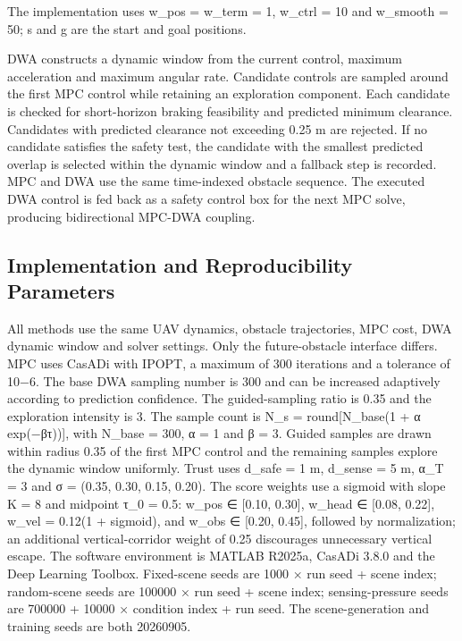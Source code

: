 \documentclass[10pt,a4paper]{article}
\begin{document}
The implementation uses w\_pos = w\_term = 1, w\_ctrl = 10 and w\_smooth = 50; s and g are the start and goal positions.

DWA constructs a dynamic window from the current control, maximum acceleration and maximum angular rate. Candidate controls are sampled around the first MPC control while retaining an exploration component. Each candidate is checked for short-horizon braking feasibility and predicted minimum clearance. Candidates with predicted clearance not exceeding 0.25 m are rejected. If no candidate satisfies the safety test, the candidate with the smallest predicted overlap is selected within the dynamic window and a fallback step is recorded. MPC and DWA use the same time-indexed obstacle sequence. The executed DWA control is fed back as a safety control box for the next MPC solve, producing bidirectional MPC-DWA coupling.

\subsection{Implementation and Reproducibility Parameters}

All methods use the same UAV dynamics, obstacle trajectories, MPC cost, DWA dynamic window and solver settings. Only the future-obstacle interface differs. MPC uses CasADi with IPOPT, a maximum of 300 iterations and a tolerance of 10−6. The base DWA sampling number is 300 and can be increased adaptively according to prediction confidence. The guided-sampling ratio is 0.35 and the exploration intensity is 3. The sample count is N\_s = round[N\_base(1 + α exp(−βτ))], with N\_base = 300, α = 1 and β = 3. Guided samples are drawn within radius 0.35 of the first MPC control and the remaining samples explore the dynamic window uniformly. Trust uses d\_safe = 1 m, d\_sense = 5 m, α\_T = 3 and σ = (0.35, 0.30, 0.15, 0.20). The score weights use a sigmoid with slope K = 8 and midpoint τ\_0 = 0.5: w\_pos ∈ [0.10, 0.30], w\_head ∈ [0.08, 0.22], w\_vel = 0.12(1 + sigmoid), and w\_obs ∈ [0.20, 0.45], followed by normalization; an additional vertical-corridor weight of 0.25 discourages unnecessary vertical escape. The software environment is MATLAB R2025a, CasADi 3.8.0 and the Deep Learning Toolbox. Fixed-scene seeds are 1000 × run seed + scene index; random-scene seeds are 100000 × run seed + scene index; sensing-pressure seeds are 700000 + 10000 × condition index + run seed. The scene-generation and training seeds are both 20260905.
\end{document}
